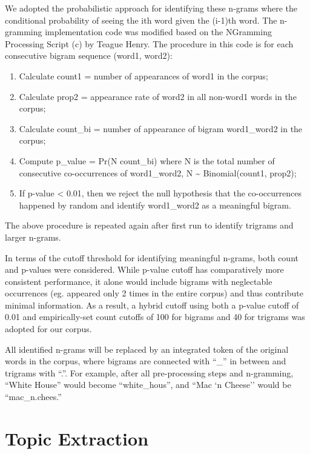 \documentclass[12pt,twoside]{dukestatscithesis}
\providecommand{\tightlist}{%
  \setlength{\itemsep}{0pt}\setlength{\parskip}{0pt}}
\theoremstyle{definition}
\theoremstyle{definition}
\theoremstyle{definition}
\theoremstyle{remark}
\begin{document}
We adopted the probabilistic approach for identifying these n-grams
where the conditional probability of seeing the ith word given the
(i-1)th word. The n-gramming implementation code was modified based on
the NGramming Processing Script (c) by Teague Henry. The procedure in
this code is for each consecutive bigram sequence (word1, word2):
\begin{enumerate}
\def\labelenumi{\arabic{enumi}.}
\tightlist
\item
  Calculate count1 = number of appearances of word1 in the corpus;\\
\item
  Calculate prop2 = appearance rate of word2 in all non-word1 words in
  the corpus;\\
\item
  Calculate count\_bi = number of appearance of bigram word1\_word2 in
  the corpus;\\
\item
  Compute p\_value = Pr(N count\_bi) where N is the total number of
  consecutive co-occurrences of word1\_word2, N \textasciitilde{}
  Binomial(count1, prop2);\\
\item
  If p-value \textless{} 0.01, then we reject the null hypothesis that
  the co-occurrences happened by random and identify word1\_word2 as a
  meaningful bigram.
\end{enumerate}
The above procedure is repeated again after first run to identify
trigrams and larger n-grams.

In terms of the cutoff threshold for identifying meaningful n-grams,
both count and p-values were considered. While p-value cutoff has
comparatively more consistent performance, it alone would include
bigrams with neglectable occurrences (eg. appeared only 2 times in the
entire corpus) and thus contribute minimal information. As a result, a
hybrid cutoff using both a p-value cutoff of 0.01 and empirically-set
count cutoffs of 100 for bigrams and 40 for trigrams was adopted for our
corpus.

All identified n-grams will be replaced by an integrated token of the
original words in the corpus, where bigrams are connected with ``\_'' in
between and trigrams with ``.''. For example, after all pre-processing
steps and n-gramming, ``White House'' would become ``white\_hous'', and
``Mac `n Cheese'' would be ``mac\_n.chees.''

\section{Topic Extraction}\label{topic-extraction}
\end{document}
